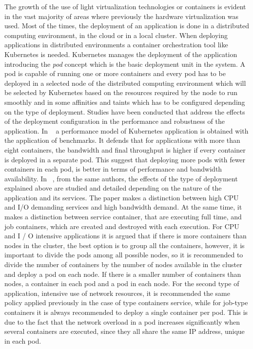 \documentclass[conference]{IEEEtran}
\begin{document}
The growth of the use of light virtualization technologies or containers is evident in the vast majority of areas where previously the hardware virtualization was used. Most of the times, the deployment of an application is done in a distributed computing environment, in the cloud or in a local cluster. When deploying applications in distributed environments a container orchestration tool like Kubernetes is needed. Kubernetes manages the deployment of the application introducing the \emph{pod} concept which is the basic deployment unit in the system. A pod is capable of running one or more containers and every pod has to be deployed in 
a selected node of the distributed computing environment which will be selected by Kubernetes based on the resources required by the node to run smoothly and
in some affinities and taints which has to be configured depending on the type of deployment. Studies have been conducted that address the effects of the deployment 
configuration in the performance and robustness of the application. In ~\cite{Rana16} a performance model of Kubernetes application is obtained with the application of benchmarks.
It defends that for applications with more than eight containers, the bandwidth and final throughput is higher if every container is deployed in a separate pod. This suggest
that deploying more pods with fewer containers in each pod, is better in terms of performance and bandwidth availability. In ~\cite{Orana18}, from the same authors, the 
effects of the type of deployment explained above are studied and detailed depending on the nature of the application and its services. The paper makes a
distinction between high CPU and I/O demanding services and high bandwidth demand. At the same time, it makes a distinction between service container,
that are executing full time, and job containers, which are created and destroyed with each execution. 
For CPU and I / O intensive applications it is argued that if there is more containers than nodes in the cluster, the best option is to group all the 
containers, however, it is important to divide the pods among all possible nodes, so it is recommended to divide the number of containers by the number of nodes 
available in the cluster and deploy a pod on each node. If there is a smaller number of containers than nodes, a container in each pod and a pod in each node. 
For the second type of application, intensive use of network resources, it is recommended the same policy applied previously in the case of type containers
service, while for job-type containers it is always recommended to deploy a single container per pod. This is due to the fact that the network overload in a pod
increases significantly when several containers are executed, since they all share the same IP address, unique in each pod.
\end{document}
